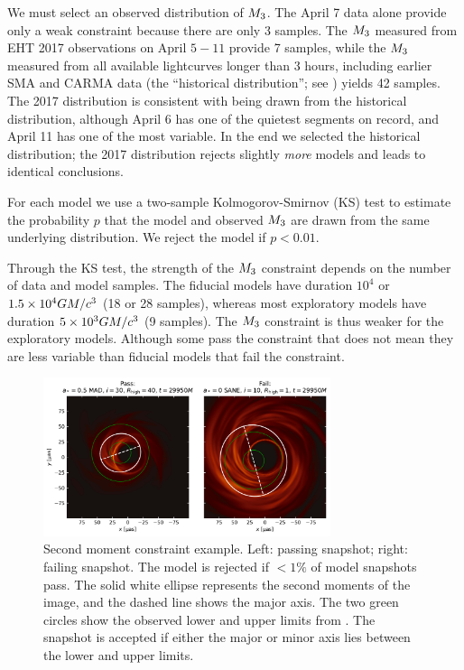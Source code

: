 We must select an observed distribution of $M_{3}$.  The April 7 data alone provide only a weak constraint because there are only 3 samples.  The $M_{3}$ measured from EHT 2017 observations on April $5-11$ provide 7 samples, while the $M_{3}$ measured from all available lightcurves longer than 3 hours, including earlier SMA and CARMA data (the ``historical distribution''; see \citealt{Wielgus2022}) yields 42 samples.  The 2017 distribution is consistent with being drawn from the historical distribution, although April 6 has one of the quietest segments on record, and April 11 has one of the most variable.  In the end we selected the historical distribution; the 2017 distribution rejects slightly {\em more} models and leads to identical conclusions.

For each model we use a two-sample Kolmogorov-Smirnov (KS) test to estimate the probability $p$ that the model and observed $M_{3}$ are drawn from the same underlying distribution.  We reject the model if $p < 0.01$.

Through the KS test, the strength of the $M_{3}$ constraint depends on the number of data and model samples.  The fiducial models have duration $10^4$ or $1.5\times 10^4 GM/c^3$ (18 or 28 samples), whereas most exploratory models have duration $5 \times 10^3 GM/c^3$ (9 samples). The $M_{3}$ constraint is thus weaker for the exploratory models.  Although some pass the constraint that does not mean they are less variable than fiducial models that fail the constraint.

\begin{figure}
  \centering
  \includegraphics[width=0.75\textwidth]{figures/passfail_sz.pdf}
  \caption{Second moment constraint example.  Left: passing snapshot; right: failing snapshot.  The model is rejected if $< 1\%$ of model snapshots pass. The solid white ellipse  represents the second moments of the image, and the dashed line shows the major axis.  The two green circles show the observed lower and upper limits from . The snapshot is accepted if either the major or minor axis lies between the lower and upper limits.
  }
  \label{fig:passfail_sz}
\end{figure}

